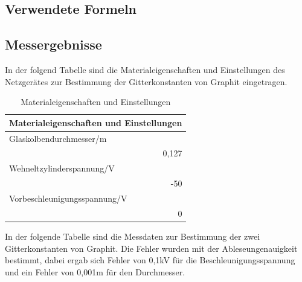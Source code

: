 \documentclass[12pt,a4paper]{article}
\begin{document}
\subsection{Verwendete Formeln}
\subsection{Messergebnisse}

In der folgend Tabelle sind die Materialeigenschaften und Einstellungen des Netzgerätes zur Bestimmung der Gitterkonstanten von Graphit eingetragen.

\begin{table}[htbp]
\caption{Materialeigenschaften und Einstellungen}
\begin{center}
\begin{tabular}{|l|}
\hline
Materialeigenschaften und Einstellungen \\ \hline
Glaskolbendurchmesser/m \\ \hline
\multicolumn{1}{|r|}{0,127} \\ \hline
Wehneltzylinderspannung/V \\ \hline
\multicolumn{1}{|r|}{-50} \\ \hline
Vorbeschleunigungsspannung/V \\ \hline
\multicolumn{1}{|r|}{0} \\ \hline
\end{tabular}
\end{center}
\label{tab:a_2_m}
\end{table}


In der folgende Tabelle sind die Messdaten zur Bestimmung der zwei Gitterkonstanten von Graphit. Die Fehler wurden mit der Ableseungenauigkeit bestimmt, dabei ergab sich Fehler von 0,1kV für die Beschleunigungsspannung und ein Fehler von 0,001m für den Durchmesser.
\end{document}
